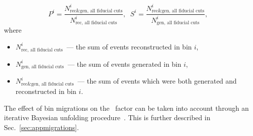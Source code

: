 \begin{equation}
P^{i} = \frac{N^{i}_{\text{rec\&gen, all fiducial cuts}} }{ N^{i}_{\text{rec, all fiducial cuts}} }, \; \;
S^{i} = \frac{N^{i}_{\text{rec\&gen, all fiducial cuts}} }{ N^{i}_{\text{gen, all fiducial cuts}} },
\label{Eq:PurityStability}
\end{equation}
where
\begin{itemize}
\item $N^i_{\text{rec, all fiducial cuts}}$~--- the sum of events reconstructed in bin $i$,
\item $N^i_{\text{gen, all fiducial cuts}}$~--- the sum of events generated in bin $i$,
\item $N^i_{\text{rec\&gen, all fiducial cuts}}$~--- the sum of events which were both generated and reconstructed in bin $i$.
\end{itemize}

The effect of bin migrations on the \C\ factor can be taken into account through an iterative Bayesian unfolding procedure~\cite{Adye:arXiv1105.1160}. This is further described in Sec.~\ref{sec:appmigrations}.
